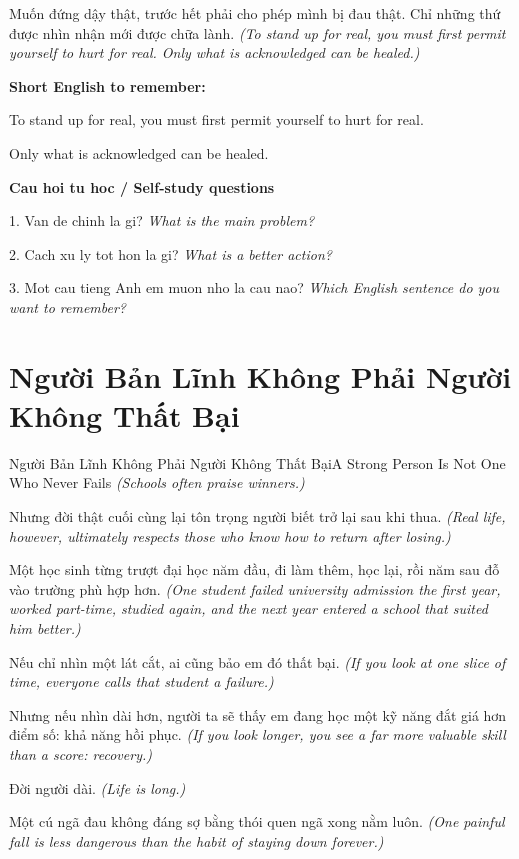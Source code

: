 \begin{baihoc}
Muốn đứng dậy thật, trước hết phải cho phép mình bị đau thật. Chỉ những thứ được nhìn nhận mới được chữa lành.
\textit{(To stand up for real, you must first permit yourself to hurt for real. Only what is acknowledged can be healed.)}
\end{baihoc}

\begin{ghinhoanh}
\textbf{Short English to remember:}

To stand up for real, you must first permit yourself to hurt for real.

Only what is acknowledged can be healed.

\end{ghinhoanh}

\begin{tuhocnhanh}
\textbf{Cau hoi tu hoc / Self-study questions}

1. Van de chinh la gi? \textit{What is the main problem?}

2. Cach xu ly tot hon la gi? \textit{What is a better action?}

3. Mot cau tieng Anh em muon nho la cau nao? \textit{Which English sentence do you want to remember?}
\end{tuhocnhanh}
\ngancach

\section{Người Bản Lĩnh Không Phải Người Không Thất Bại}
\begin{truyen}{Người Bản Lĩnh Không Phải Người Không Thất Bại}{A Strong Person Is Not One Who Never Fails}
\textit{(Schools often praise winners.)}

Nhưng đời thật cuối cùng lại tôn trọng người biết trở lại sau khi thua.
\textit{(Real life, however, ultimately respects those who know how to return after losing.)}

Một học sinh từng trượt đại học năm đầu, đi làm thêm, học lại, rồi năm sau đỗ vào trường phù hợp hơn.
\textit{(One student failed university admission the first year, worked part-time, studied again, and the next year entered a school that suited him better.)}

Nếu chỉ nhìn một lát cắt, ai cũng bảo em đó thất bại.
\textit{(If you look at one slice of time, everyone calls that student a failure.)}

Nhưng nếu nhìn dài hơn, người ta sẽ thấy em đang học một kỹ năng đắt giá hơn điểm số: khả năng hồi phục.
\textit{(If you look longer, you see a far more valuable skill than a score: recovery.)}

Đời người dài.
\textit{(Life is long.)}

Một cú ngã đau không đáng sợ bằng thói quen ngã xong nằm luôn.
\textit{(One painful fall is less dangerous than the habit of staying down forever.)}

\end{truyen}

